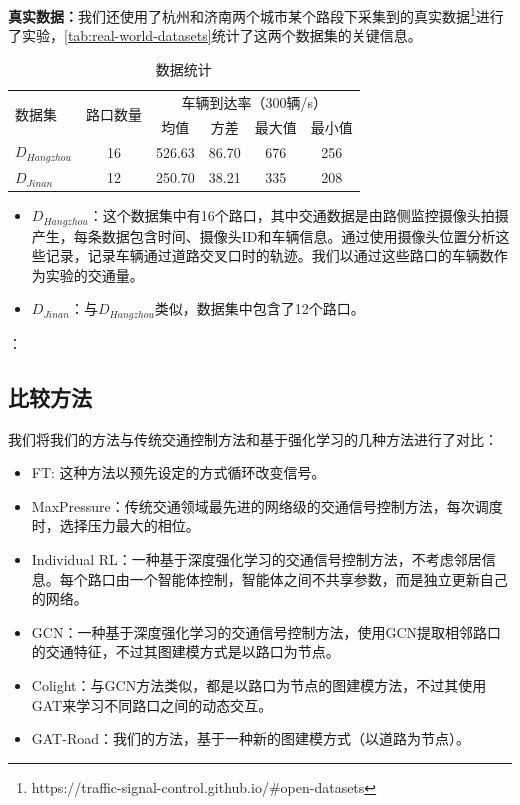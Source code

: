 \textbf{真实数据：}我们还使用了杭州和济南两个城市某个路段下采集到的真实数据\footnote{https://traffic-signal-control.github.io/\#open-datasets}进行了实验，\autoref{tab:real-world-datasets}统计了这两个数据集的关键信息。
\begin{table}[htb]
  \caption{数据统计}
  \label{tab:real-world-datasets}
  \begin{tabular}{lccccc}
  \toprule
  \multirow{2}{*}{数据集} & \multirow{2}{*}{路口数量} & \multicolumn{4}{c}{车辆到达率（300辆/s）} \\
  & & \multicolumn{1}{c}{均值} & \multicolumn{1}{c}{方差} & \multicolumn{1}{c}{最大值} & \multicolumn{1}{c}{最小值} \\
  \midrule
  $D_{Hangzhou}$ & 16 & 526.63 & 86.70 & 676 & 256 \\
  $D_{Jinan}$ & 12 & 250.70 & 38.21 & 335 & 208 \\
  \bottomrule
  \end{tabular}
\end{table}
\begin{itemize}
  \item $D_{Hangzhou}$：这个数据集中有16个路口，其中交通数据是由路侧监控摄像头拍摄产生，每条数据包含时间、摄像头ID和车辆信息。通过使用摄像头位置分析这些记录，记录车辆通过道路交叉口时的轨迹。我们以通过这些路口的车辆数作为实验的交通量。
  \item $D_{Jinan}$：与$D_{Hangzhou}$类似，数据集中包含了12个路口。
\end{itemize}：

\subsection{比较方法}
我们将我们的方法与传统交通控制方法和基于强化学习的几种方法进行了对比：
\begin{itemize}
  \item FT\cite{koonce2008traffic}: 这种方法以预先设定的方式循环改变信号。
  \item MaxPressure\cite{varaiya2013max}：传统交通领域最先进的网络级的交通信号控制方法，每次调度时，选择压力最大的相位。
  \item Individual RL\cite{wei2018intellilight}：一种基于深度强化学习的交通信号控制方法，不考虑邻居信息。每个路口由一个智能体控制，智能体之间不共享参数，而是独立更新自己的网络。
  \item GCN\cite{van2016coordinated}：一种基于深度强化学习的交通信号控制方法，使用GCN提取相邻路口的交通特征，不过其图建模方式是以路口为节点。
  \item Colight\cite{wei2019colight}：与GCN方法类似，都是以路口为节点的图建模方法，不过其使用GAT来学习不同路口之间的动态交互。
  \item GAT-Road：我们的方法，基于一种新的图建模方式（以道路为节点）。
\end{itemize}
